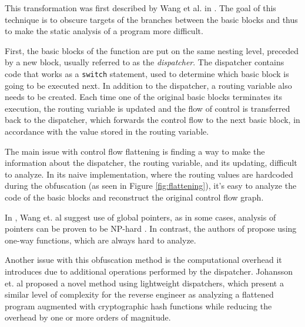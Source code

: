 \documentclass[
  digital, %
  notable,   %
  twoside, %
  nolof,     %
  nolot,     %
]{fithesis3}
\theoremstyle{definition}
\begin{document}
This transformation was first described by Wang et al. in \cite{wang2001protection}. The goal of this technique is to obscure targets of the branches between the basic blocks and thus to make the static analysis of a program more difficult. 

First, the basic blocks of the function are put on the same nesting level, preceded by a new block, usually referred to as the \textit{dispatcher}. The dispatcher contains code that works as a \texttt{switch} statement, used to determine which basic block is going to be executed next. In addition to the dispatcher, a routing variable also needs to be created. Each time one of the original basic blocks terminates its execution, the routing variable is updated and the flow of control is transferred back to the dispatcher, which forwards the control flow to the next basic block, in accordance with the value stored in the routing variable. 

The main issue with control flow flattening is finding a way to make the information about the dispatcher, the routing variable, and its updating, difficult to analyze. In its naive implementation, where the routing values are hardcoded during the obfuscation (as seen in Figure \ref{fig:flattening}), it's easy to analyze the code of the basic blocks and reconstruct the original control flow graph. 

In \cite{wang2001protection}, Wang et. al suggest use of global pointers, as in some cases, analysis of pointers can be proven to be NP-hard \cite{np_pointers}. In contrast, the authors of \cite{cappaert2010general} propose using one-way functions, which are always hard to analyze. 

Another issue with this obfuscation method is the computational overhead it introduces due to additional operations performed by the dispatcher. Johansson et. al \cite{johansson2017lightweight} proposed a novel method using lightweight dispatchers, which present a similar level of complexity for the reverse engineer as analyzing a flattened program augmented with cryptographic hash functions while reducing the overhead by one or more orders of magnitude.
\end{document}
